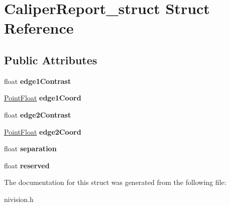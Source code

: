 \hypertarget{structCaliperReport__struct}{
\section{CaliperReport\_\-struct Struct Reference}
\label{structCaliperReport__struct}
}
\subsection*{Public Attributes}
\begin{DoxyCompactItemize}
\item 
\hypertarget{structCaliperReport__struct_a013604bfcc7f931fe9d940a7ef8185cd}{
float {\bfseries edge1Contrast}}
\label{structCaliperReport__struct_a013604bfcc7f931fe9d940a7ef8185cd}

\item 
\hypertarget{structCaliperReport__struct_a7388d1b1764a1f7bbacc84274182ca63}{
\hyperlink{structPointFloat__struct}{PointFloat} {\bfseries edge1Coord}}
\label{structCaliperReport__struct_a7388d1b1764a1f7bbacc84274182ca63}

\item 
\hypertarget{structCaliperReport__struct_ae497e44c4bd09a9396ce1588eb783ee0}{
float {\bfseries edge2Contrast}}
\label{structCaliperReport__struct_ae497e44c4bd09a9396ce1588eb783ee0}

\item 
\hypertarget{structCaliperReport__struct_ad6d3ec530de336d45c07aec4a857e4a4}{
\hyperlink{structPointFloat__struct}{PointFloat} {\bfseries edge2Coord}}
\label{structCaliperReport__struct_ad6d3ec530de336d45c07aec4a857e4a4}

\item 
\hypertarget{structCaliperReport__struct_ac3e64660b799f6b920e06c83053ce0a3}{
float {\bfseries separation}}
\label{structCaliperReport__struct_ac3e64660b799f6b920e06c83053ce0a3}

\item 
\hypertarget{structCaliperReport__struct_af2c5d01c460c44ef7e38ae6f9192878c}{
float {\bfseries reserved}}
\label{structCaliperReport__struct_af2c5d01c460c44ef7e38ae6f9192878c}

\end{DoxyCompactItemize}


The documentation for this struct was generated from the following file:\begin{DoxyCompactItemize}
\item 
nivision.h\end{DoxyCompactItemize}
